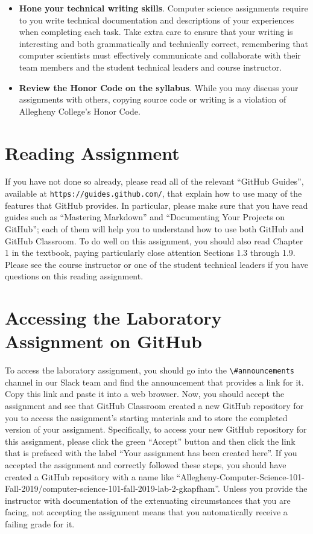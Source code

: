 \documentclass[11pt]{article}
\newcommand{\url}[1]{\lstinline{#1}}
\newcommand{\channel}[1]{\lstinline{#1}}
\begin{document}
\begin{itemize}
\item {\bf Hone your technical writing skills}. Computer science assignments
  require to you write technical documentation and descriptions of your
  experiences when completing each task. Take extra care to ensure that your
  writing is interesting and both grammatically and technically correct,
  remembering that computer scientists must effectively communicate and
  collaborate with their team members and the student technical leaders and
  course instructor.

\item {\bf Review the Honor Code on the syllabus}. While you may discuss your
  assignments with others, copying source code or writing is a violation of
  Allegheny College's Honor Code.

\end{itemize}

\section*{Reading Assignment}

If you have not done so already, please read all of the relevant ``GitHub
Guides'', available at \url{https://guides.github.com/}, that explain how to use
many of the features that GitHub provides. In particular, please make sure that
you have read guides such as ``Mastering Markdown'' and ``Documenting Your
Projects on GitHub''; each of them will help you to understand how to use both
GitHub and GitHub Classroom. To do well on this assignment, you should also read
Chapter 1 in the textbook, paying particularly close attention Sections 1.3
through 1.9. Please see the course instructor or one of the student technical
leaders if you have questions on this reading assignment.

\section*{Accessing the Laboratory Assignment on GitHub}

To access the laboratory assignment, you should go into the
\channel{\#announcements} channel in our Slack team and find the announcement
that provides a link for it. Copy this link and paste it into a web browser.
Now, you should accept the assignment and see that GitHub Classroom created a
new GitHub repository for you to access the assignment's starting materials and
to store the completed version of your assignment. Specifically, to access your
new GitHub repository for this assignment, please click the green ``Accept''
button and then click the link that is prefaced with the label ``Your
assignment has been created here''. If you accepted the assignment and
correctly followed these steps, you should have created a GitHub repository
with a name like
``Allegheny-Computer-Science-101-Fall-2019/computer-science-101-fall-2019-lab-2-gkapfham''.
Unless you provide the instructor with documentation of the extenuating
circumstances that you are facing, not accepting the assignment means that you
automatically receive a failing grade for it.
\end{document}
